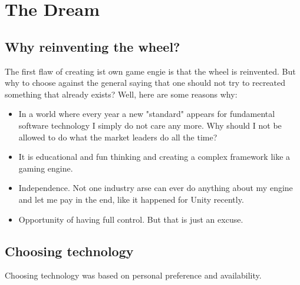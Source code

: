 \documentclass[../index.tex]{subfiles}
\begin{document}
\part{The Dream}

\chapter{Why reinventing the wheel?}
The first flaw of creating ist own game engie is that the wheel is reinvented.
But why to choose against the general saying that one should not try to recreated something that already exists?
Well, here are some reasons why:


\begin{itemize}

\item In a world where every year a new "standard" appears for fundamental software technology I simply do not care any more. Why should I not be allowed to do what the market leaders do all the time?

\item It is educational and fun thinking and creating a complex framework like a gaming engine.

\item Independence. Not one industry arse can ever do anything about my engine and let me pay in the end, like it happened for Unity recently.

\item Opportunity of having full control. But that is just an excuse.

\end{itemize}


\chapter{Choosing technology}
Choosing technology was based on personal preference and availability.
\end{document}
